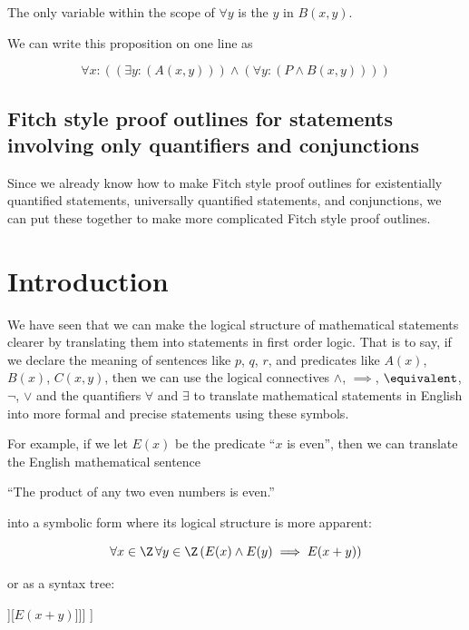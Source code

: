 \begin{xca}
	The only variable within the scope of $\forall y$ is the $y$ in $B(x,y)$.
	
	We can write this proposition on one line as
	
	\[
	\forall x: (  (\exists y: ( A(x,y)))  \wedge (\forall y: ( P \wedge  B(x,y)))  )
	\]
	
\end{xca}

\subsection{Fitch style proof outlines for statements involving only quantifiers and conjunctions}

Since we already know how to make Fitch style proof outlines for existentially quantified statements, universally quantified statements, and conjunctions, we can put these together to make more complicated Fitch style proof outlines.



\section{Introduction}

We have seen that we can make the logical structure of mathematical statements clearer by translating them into statements in first order logic.  That is to say, if we declare the meaning of sentences like $p$, $q$, $r$,  and predicates like $A(x)$,  $B(x)$,  $C(x,y)$, then we can use the logical connectives $\wedge$, $\implies$, $\equivalent$, $\neg$, $\vee$ and the quantifiers $\forall$ and $\exists$ to translate mathematical statements in English into more formal and precise statements using these symbols.

For example, if we let $E(x)$ be the predicate ``$x$ is even'', then we can translate the English mathematical sentence 

{ \begin{center}
		``The product of any two even numbers is even.''
		\end{center}
}

into a symbolic form where its logical structure is more apparent:

$$
\forall x \in \Z \, \forall y \in \Z \left( E(x) \wedge E(y) \implies E(x+y) \right)
$$

or as a syntax tree:

\begin{center}
\begin{forest}
	[$\forall x \in \Z$[$\forall y \in \Z$[$\implies$[$\wedge$[$E(x)$][$E(y)$]][$E(x+y)$]]]
]
\end{forest}
\end{center}

